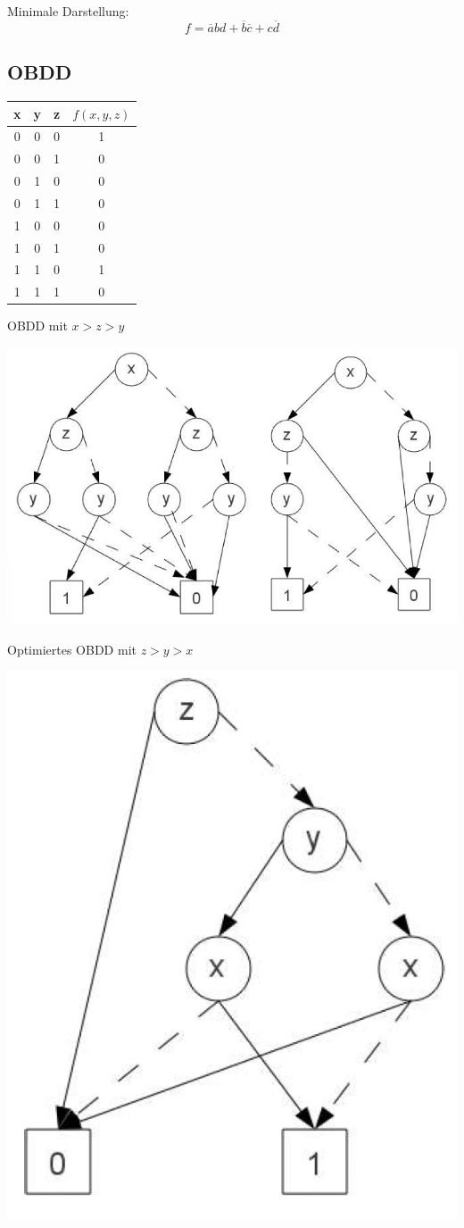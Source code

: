 \documentclass[a4paper,6pt]{article}
\begin{document}
\begin{multicols*}{3}
\scriptsize

Minimale Darstellung:
$$f = \overline{a}bd + \overline{b}\overline{c} + c\overline{d}$$


\subsection{OBDD}

\scriptsize
\begin{tabular}{ccc|c}
    \hline
    x & y & z & $f(x,y,z)$ \\
    \hline
    0 & 0 & 0 & 1 \\
    0 & 0 & 1 & 0 \\
    0 & 1 & 0 & 0 \\
    0 & 1 & 1 & 0 \\
    1 & 0 & 0 & 0 \\
    1 & 0 & 1 & 0 \\
    1 & 1 & 0 & 1 \\
    1 & 1 & 1 & 0 \\
    \hline
\end{tabular}

\scriptsize

OBDD mit $x > z > y$

\begin{center}
    \includegraphics[width=1\linewidth]{resources/OBDD.png}
\end{center}

Optimiertes OBDD mit $z > y > x$

\begin{center}
    \includegraphics[width=0.5\linewidth]{resources/Optimiertes_OBDD.png}
\end{center}


\end{multicols*}
\end{document}
